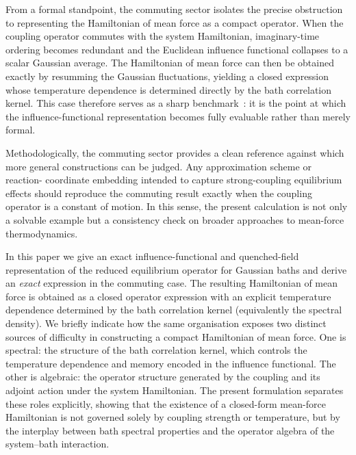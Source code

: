 From a formal standpoint, the commuting sector isolates the precise obstruction
to representing the Hamiltonian of mean force as a compact operator. When the
coupling operator commutes with the system Hamiltonian, imaginary-time ordering
becomes redundant and the Euclidean influence functional collapses to a scalar
Gaussian average. The Hamiltonian of mean force can then be obtained exactly by
resumming the Gaussian fluctuations, yielding a closed expression whose
temperature dependence is determined directly by the bath correlation kernel.
This case therefore serves as a sharp benchmark~\cite{campisiTalknerHanggi2009Solvable}: it is the point at which the
influence-functional representation becomes fully evaluable rather than merely
formal.

Methodologically, the commuting sector provides a clean reference against which
more general constructions can be judged. Any approximation scheme or reaction-
coordinate embedding intended to capture strong-coupling equilibrium effects
should reproduce the commuting result exactly when the coupling operator is a
constant of motion. In this sense, the present calculation is not only a solvable
example but a consistency check on broader approaches to mean-force
thermodynamics.


In this paper we give an exact influence-functional and quenched-field
representation of the reduced equilibrium operator for Gaussian baths and derive an \emph{exact} expression in the commuting case. The resulting Hamiltonian of mean force is obtained as a
closed operator expression with an explicit temperature dependence determined by
the bath correlation kernel (equivalently the spectral density). We briefly indicate how the same organisation exposes two distinct sources of
difficulty in constructing a compact Hamiltonian of mean force. One is
spectral: the structure of the bath correlation kernel, which controls the
temperature dependence and memory encoded in the influence functional. The
other is algebraic: the operator structure generated by the coupling and its
adjoint action under the system Hamiltonian. The present formulation separates
these roles explicitly, showing that the existence of a closed-form mean-force
Hamiltonian is not governed solely by coupling strength or temperature, but by
the interplay between bath spectral properties and the operator algebra of the
system--bath interaction.

